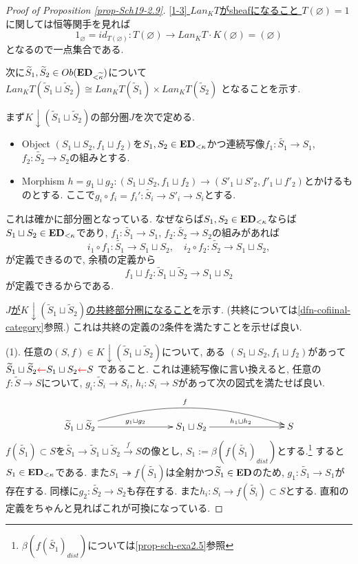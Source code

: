 \documentclass[dvipdfmx,a4paper,11pt]{article}
\theoremstyle{definition}
\newcommand{\xr}[1]{\textcolor{red}{#1}}
\begin{document}
\begin{proof}[Proof of Proposition \ref{prop-Sch19-2.9}]
\underline{[1-3] $Lan_{K}T$がsheafになること }
$T(\varnothing)=1$に関しては恒等関手を見れば
$$
1_{\varnothing}=id_{T(\varnothing)} : T(\varnothing) \to   Lan_{K}T\cdot K(\varnothing)=(\varnothing)
$$
となるので一点集合である.

次に$\widetilde{S}_1,  \widetilde{S}_2\in Ob({\bf ED}_{<\widetilde{\kappa}})$について
$Lan_{K}T (\widetilde{S}_1 \sqcup  \widetilde{S}_2) \cong
 Lan_{K}T (\widetilde{S}_1 ) \times  Lan_{K}T ( \widetilde{S}_2)$
となることを示す.

まず$K \downarrow  (\widetilde{S}_1 \sqcup  \widetilde{S}_2)$の部分圏$J$を次で定める.
\begin{itemize}
\item Object $(S_1 \sqcup  S_2, f_1 \sqcup  f_2)$を$S_1, S_2 \in {\bf ED}_{<\kappa}$かつ連続写像$f_1 : \widetilde{S_1} \to S_1$, $f_2 : \widetilde{S_2} \to S_2$の組みとする. 
\item Morphism $h=g_1\sqcup g_2 : (S_1 \sqcup S_2, f_1 \sqcup f_2) \to  (S'_{1} \sqcup S'_2, f'_1 \sqcup f'_2)$とかけるものとする. ここで$g_i \circ f_i = f_{i}' : \widetilde{S_i} \to S'_i \to S_{i}$とする. 
\end{itemize}
これは確かに部分圏となっている. 
なぜならば$S_1, S_2 \in {\bf ED}_{<\kappa}$ならば$S_1 \sqcup  S_2 \in {\bf ED}_{<\kappa}$であり, $f_1 : \widetilde{S_1} \to S_1$, $f_2 : \widetilde{S_2} \to S_2$の組みがあれば
$$
i_1 \circ f_1 : \widetilde{S_1} \to S_1 \sqcup S_2, \quad 
i_2 \circ f_2 : \widetilde{S_2} \to S_1 \sqcup S_2,
$$
が定義できるので, 余積の定義から
$$
f_1 \sqcup f_2  : \widetilde{S}_1 \sqcup \widetilde{S}_2  \to S_1 \sqcup S_2
$$
が定義できるからである. 

\underline{$J$が$K \downarrow  (\widetilde{S}_1 \sqcup  \widetilde{S}_2)$の共終部分圏になること}を示す.
(共終については\ref{dfn-cofiinal-category}参照.) 
これは共終の定義の2条件を満たすことを示せば良い.

(1). 任意の$(S, f) \in K \downarrow  (\widetilde{S}_1 \sqcup  \widetilde{S}_2)$について, ある
$(S_1 \sqcup  S_2, f_1 \sqcup  f_2)$があって
$\widetilde{S}_1 \sqcup  \widetilde{S}_2 \xr{\leftarrow} S_1 \sqcup  S_2  \xr{\leftarrow} S$
であること.
これは連続写像に言い換えると, 任意の$f : \widetilde{S} \to S$について, 
$g_i: \widetilde{S}_i \to S_i$, $h_i: S_i \to S$があって次の図式を満たせば良い.
\begin{equation*}
\label{eq-conti}
\xymatrix@C=78pt@R=20pt{
\widetilde{S}_1 \sqcup  \widetilde{S}_2 \ar@/^20pt/[rr]^{f} 
 \ar@{->}[r]^{g_1 \sqcup  g_2}
&S_1 \sqcup  S_2  \ar@{->}[r]^{h_1 \sqcup  h_2}
& S
\\
}
\end{equation*}
$f(\widetilde{S_1} ) \subset S$を$\widetilde{S_1} \to \widetilde{S}_1 \sqcup  \widetilde{S}_2 \overset{f}{\to} S$の像とし, $S_1 := \beta (f(\widetilde{S_1} )_{dist}) $とする.\footnote{ $\beta (f(\widetilde{S_1} )_{dist})$については\ref{prop-sch-exa2.5}参照}
すると$S_1 \in {\bf ED}_{<\kappa}$である.
また$S_1 \twoheadrightarrow f(\widetilde{S_1} ) $は全射かつ$\widetilde{S}_1 \in {\bf ED}$のため, $g_1 : \widetilde{S_1} \to S_1$が存在する. 
同様に$g_2 : \widetilde{S_2} \to S_2$も存在する.
また$h_i : S_i \to f(\widetilde{S_i} ) \subset S$とする.
直和の定義をちゃんと見ればこれが可換になっている.


\end{proof}
\end{document}
